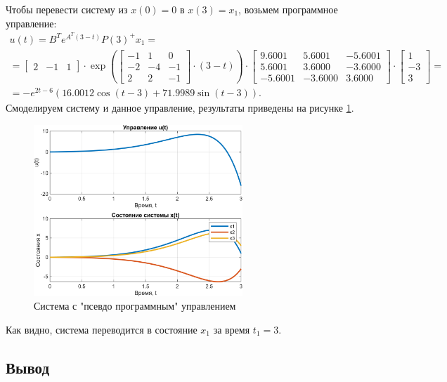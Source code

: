 Чтобы перевести систему из $x(0)=0$ в $x(3)=x_1$, возьмем программное управление:
\begin{multline*}
    u(t) = B^T e^{A^T(3 - t)} P(3)^+ x_1 = \\ =
    \begin{bmatrix}
        2 & -1 & 1
    \end{bmatrix}\cdot
    \exp\left( 
    \begin{bmatrix}
        -1&  1 & 0\\
        -2 &-4& -1\\
        2  &2& -1
    \end{bmatrix}\cdot(3 - t) \right)\cdot
    \begin{bmatrix}
        9.6001&    5.6001  & -5.6001\\
        5.6001 &   3.6000 &  -3.6000\\
       -5.6001  & -3.6000&    3.6000
    \end{bmatrix}\cdot
    \begin{bmatrix}
        1 \\ -3 \\ 3
    \end{bmatrix}=\\
    =-e^{2t-6}\left(16.0012\cos\left(t-3\right)+71.9989\sin\left(t-3\right)\right).
\end{multline*}
Смоделируем систему и данное управление, результаты приведены на рисунке \ref{fig:task2}.
\begin{figure}[H]
    \centering
    \includegraphics[width=0.7\textwidth]{figs/task_2.png}
    \caption{Система с "псевдо программным" управлением}
    \label{fig:task2}
\end{figure}
Как видно, система переводится в состояние $x_1$ за время $t_1=3$.

\subsection{Вывод}


